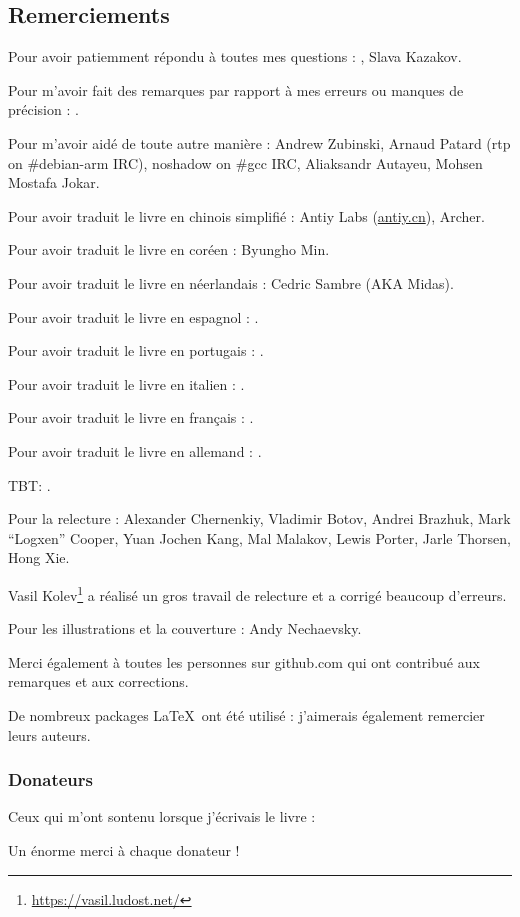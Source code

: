 \subsection*{Remerciements}

Pour avoir patiemment répondu à toutes mes questions : \HERMIT, Slava  Kazakov.

Pour m'avoir fait des remarques par rapport à mes erreurs ou manques de précision : \PeopleMistakesInaccuracies{}.

Pour m'avoir aidé de toute autre manière :
Andrew Zubinski,
Arnaud Patard (rtp on \#debian-arm IRC),
noshadow on \#gcc IRC,
Aliaksandr Autayeu,
Mohsen Mostafa Jokar.

Pour avoir traduit le livre en chinois simplifié :
Antiy Labs (\href{http://antiy.cn}{antiy.cn}), Archer.

Pour avoir traduit le livre en coréen : Byungho Min.

Pour avoir traduit le livre en néerlandais : Cedric Sambre (AKA Midas).

Pour avoir traduit le livre en espagnol : \PeopleSpanishTranslators{}.

Pour avoir traduit le livre en portugais : \PeoplePTBRTranslators{}.

Pour avoir traduit le livre en italien : \PeopleItalianTranslators{}.

Pour avoir traduit le livre en français : \PeopleFrenchTranslators{}.

Pour avoir traduit le livre en allemand : \PeopleGermanTranslators{}.

\ac{TBT}: \PeoplePolishTranslators{}.

Pour la relecture :
Alexander  Chernenkiy,
Vladimir Botov,
Andrei Brazhuk,
Mark ``Logxen'' Cooper, Yuan Jochen Kang, Mal Malakov, Lewis Porter, Jarle Thorsen, Hong Xie.

Vasil Kolev\footnote{\url{https://vasil.ludost.net/}} a réalisé un gros travail de relecture et a corrigé beaucoup d'erreurs.

Pour les illustrations et la couverture : Andy Nechaevsky.

Merci également à toutes les personnes sur github.com qui ont contribué aux remarques et aux corrections\FNGithubContributors{}.

De nombreux packages \LaTeX\ ont été utilisé : j'aimerais également remercier leurs auteurs.

\subsubsection*{Donateurs}

Ceux qui m'ont sontenu lorsque j'écrivais le livre :



Un énorme merci à chaque donateur !
